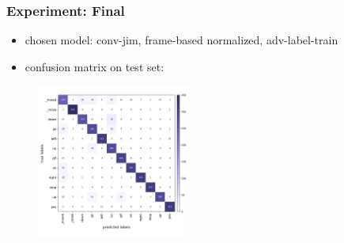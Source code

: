 \begin{frame}
  \frametitle{Experiment: Final}
  \begin{itemize}
      \item chosen model: conv-jim, frame-based normalized, adv-label-train
      \item confusion matrix on test set:
  \end{itemize}
  \begin{figure}[!ht] \includegraphics[width=0.45\textwidth]{../5_exp/figs/exp_final_confusion.png} \end{figure}
\end{frame}